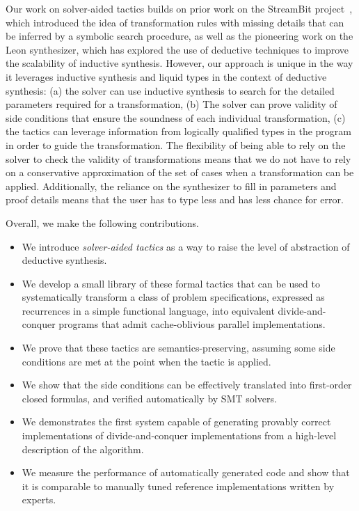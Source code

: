 Our work on solver-aided tactics builds on prior work on the StreamBit project~\cite{PLDI05/Solar-Lezama}, which
introduced the idea of transformation rules with missing details that can be inferred by a symbolic search procedure, as
well as the pioneering work on the Leon synthesizer, which has explored the use of deductive techniques to improve the
scalability of inductive synthesis. However, our approach is unique in the way it leverages inductive synthesis and
liquid types in the context of deductive synthesis: 
(a) the solver can use inductive synthesis to search for the detailed parameters required for a transformation,
(b) The solver can prove validity of side conditions that ensure the soundness of each individual transformation, 
(c) the tactics can leverage information from logically qualified types in the program in
    order to guide the transformation. 
The flexibility of being able to rely on the solver to check the validity of transformations means that we do not have to rely on a conservative approximation of the set of cases when a transformation can be applied. Additionally, the reliance on the synthesizer to fill in parameters and proof details means that the user has to type less and has less chance for error.

Overall, we make the following contributions.
\begin{itemize}
\item We introduce \emph{solver-aided tactics} as a way to raise the level of abstraction of deductive synthesis.
\item We develop a small library of these formal tactics that can be used to 
  systematically transform a class of problem specifications,
  expressed as recurrences in a simple functional language,
  into equivalent divide-and-conquer programs that admit cache-oblivious parallel
  implementations.
\item We prove that these tactics are semantics-preserving, assuming some side conditions are met
  at the point when the tactic is applied.
\item We show that the side conditions can be effectively translated into first-order closed
  formulas, and verified automatically by SMT solvers.
\item We demonstrates the first system capable of generating provably correct implementations of divide-and-conquer implementations from a high-level description of the algorithm. 
\item We measure the performance of automatically generated code and show that it is comparable to manually tuned reference implementations written by experts.
\end{itemize}
